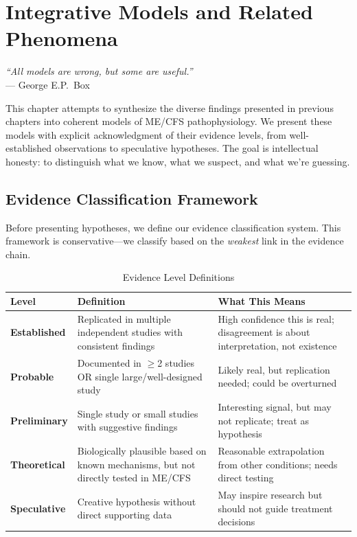 \chapter{Integrative Models and Related Phenomena}
\label{ch:integrative-models}

\begin{flushright}
\textit{``All models are wrong, but some are useful.''}\\
--- George E.P.\ Box
\end{flushright}

\vspace{1em}

This chapter attempts to synthesize the diverse findings presented in previous chapters into coherent models of ME/CFS pathophysiology. We present these models with explicit acknowledgment of their evidence levels, from well-established observations to speculative hypotheses. The goal is intellectual honesty: to distinguish what we know, what we suspect, and what we're guessing.

\section{Evidence Classification Framework}
\label{sec:evidence-classification}

Before presenting hypotheses, we define our evidence classification system. This framework is conservative---we classify based on the \textit{weakest} link in the evidence chain.

\begin{table}[htbp]
\centering
\caption{Evidence Level Definitions}
\label{tab:evidence-levels}
\begin{tabular}{p{2.5cm}p{4cm}p{6cm}}
\toprule
\textbf{Level} & \textbf{Definition} & \textbf{What This Means} \\
\midrule
\textbf{Established} & Replicated in multiple independent studies with consistent findings & High confidence this is real; disagreement is about interpretation, not existence \\
\addlinespace
\textbf{Probable} & Documented in $\geq$2 studies OR single large/well-designed study & Likely real, but replication needed; could be overturned \\
\addlinespace
\textbf{Preliminary} & Single study or small studies with suggestive findings & Interesting signal, but may not replicate; treat as hypothesis \\
\addlinespace
\textbf{Theoretical} & Biologically plausible based on known mechanisms, but not directly tested in ME/CFS & Reasonable extrapolation from other conditions; needs direct testing \\
\addlinespace
\textbf{Speculative} & Creative hypothesis without direct supporting data & May inspire research but should not guide treatment decisions \\
\bottomrule
\end{tabular}
\end{table}

